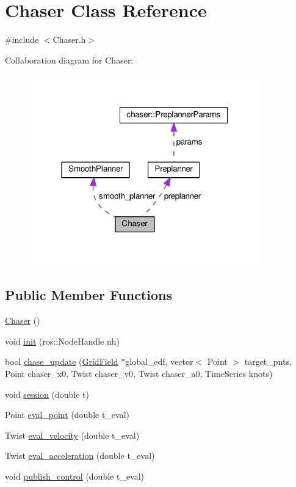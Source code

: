 \hypertarget{class_chaser}{}\section{Chaser Class Reference}
\label{class_chaser}


{\ttfamily \#include $<$Chaser.\+h$>$}



Collaboration diagram for Chaser\+:
\nopagebreak
\begin{figure}[H]
\begin{center}
\leavevmode
\includegraphics[width=284pt]{class_chaser__coll__graph}
\end{center}
\end{figure}
\subsection*{Public Member Functions}
\begin{DoxyCompactItemize}
\item 
\hyperlink{class_chaser_ae1179fa7b77db9c80468f88222e32f09}{Chaser} ()
\item 
void \hyperlink{class_chaser_a3538485980643e885755608e4297d1f6}{init} (ros\+::\+Node\+Handle nh)
\item 
bool \hyperlink{class_chaser_a8feeca68466b9b4576ee9c99b624dfc5}{chase\+\_\+update} (\hyperlink{struct_grid_field}{Grid\+Field} $\ast$global\+\_\+edf, vector$<$ Point $>$ target\+\_\+pnts, Point chaser\+\_\+x0, Twist chaser\+\_\+v0, Twist chaser\+\_\+a0, Time\+Series knots)
\item 
void \hyperlink{class_chaser_a7d736728bb5327acf0d334d7d4b1b844}{session} (double t)
\item 
Point \hyperlink{class_chaser_a6dca60b8af1c63eff3235515255cf355}{eval\+\_\+point} (double t\+\_\+eval)
\item 
Twist \hyperlink{class_chaser_a208374e7b85f9a35c1c00ec4f1ec65c3}{eval\+\_\+velocity} (double t\+\_\+eval)
\item 
Twist \hyperlink{class_chaser_a2fe36102d5a9befcb4c6ada3375260ed}{eval\+\_\+acceleration} (double t\+\_\+eval)
\item 
void \hyperlink{class_chaser_a439adefdcbe7825ad80753ac5723ed41}{publish\+\_\+control} (double t\+\_\+eval)
\end{DoxyCompactItemize}

